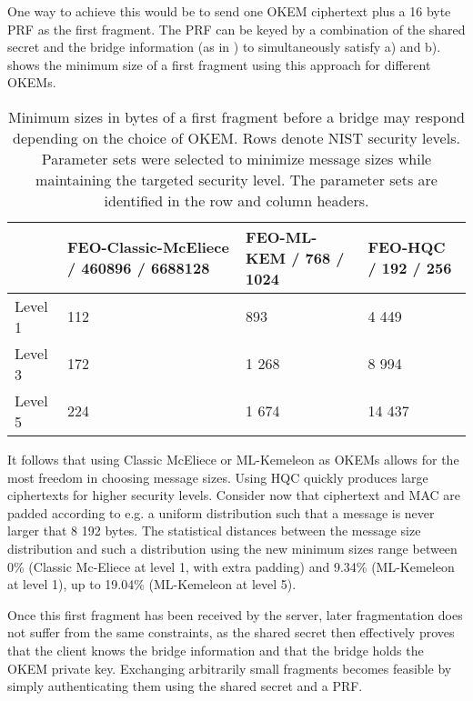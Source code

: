 One way to achieve this would be to send one OKEM ciphertext plus a 16 byte PRF as the first fragment. The PRF can be keyed by a combination of the shared secret and the bridge information (as in \drivel{}) to simultaneously satisfy a) and b).
 shows the minimum size of a first fragment using this approach for different OKEMs.

\begin{table}
    \centering
    \begin{tabular}{@{} L{0.1\textwidth-\tabcolsep} | L{0.35\tabcolsep} L{0.25\tabcolsep} L{0.2\textwidth-\tabcolsep} @{}}
        & FEO-Classic-McEliece / 460896 / 6688128
        & FEO-ML-KEM / 768 / 1024
        & FEO-HQC / 192 / 256
        \\ \hline
    Level 1 & 112 & 893 & 4 449 \\
    Level 3 & 172 & 1 268 & 8 994 \\
    Level 5 & 224 & 1 674 & 14 437
    \end{tabular}
    \caption[
        Minimum sizes in bytes of a first fragment before a bridge may respond depending on the choice of OKEM.
    ]{
        Minimum sizes in bytes of a first fragment before a bridge may respond depending on the choice of OKEM. Rows denote NIST security levels. Parameter sets were selected to minimize message sizes while maintaining the targeted security level. The parameter sets are identified in the row and column headers.
    }
    \label{tab:frag-min-needed}
\end{table}

It follows that using Classic McEliece or ML-Kemeleon as OKEMs allows for the most freedom in choosing message sizes. Using HQC quickly produces large ciphertexts for higher security levels. Consider now that ciphertext and MAC are padded according to e.g. a uniform distribution such that a message is never larger that 8 192 bytes. The statistical distances between the \obfsfour{} message size distribution and such a distribution using the new minimum sizes range between 0\% (Classic Mc-Eliece at level 1, with extra padding) and 9.34\% (ML-Kemeleon at level 1), up to 19.04\% (ML-Kemeleon at level 5).

Once this first fragment has been received by the server, later fragmentation does not suffer from the same constraints, as the shared secret then effectively proves that the client knows the bridge information and that the bridge holds the OKEM private key. Exchanging arbitrarily small fragments becomes feasible by simply authenticating them using the shared secret and a PRF.

